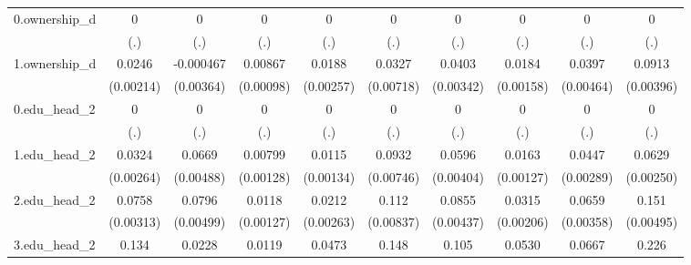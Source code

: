 \begin{table}[htbp]
\begin{tabular}{l*{9}{c}}
0.ownership\_d&           0         &           0         &           0         &           0         &           0         &           0         &           0         &           0         &           0         \\
            &         (.)         &         (.)         &         (.)         &         (.)         &         (.)         &         (.)         &         (.)         &         (.)         &         (.)         \\
1.ownership\_d&      0.0246\sym{***}&   -0.000467         &     0.00867\sym{***}&      0.0188\sym{***}&      0.0327\sym{***}&      0.0403\sym{***}&      0.0184\sym{***}&      0.0397\sym{***}&      0.0913\sym{***}\\
            &   (0.00214)         &   (0.00364)         &   (0.00098)         &   (0.00257)         &   (0.00718)         &   (0.00342)         &   (0.00158)         &   (0.00464)         &   (0.00396)         \\
0.edu\_head\_2&           0         &           0         &           0         &           0         &           0         &           0         &           0         &           0         &           0         \\
            &         (.)         &         (.)         &         (.)         &         (.)         &         (.)         &         (.)         &         (.)         &         (.)         &         (.)         \\
1.edu\_head\_2&      0.0324\sym{***}&      0.0669\sym{***}&     0.00799\sym{***}&      0.0115\sym{***}&      0.0932\sym{***}&      0.0596\sym{***}&      0.0163\sym{***}&      0.0447\sym{***}&      0.0629\sym{***}\\
            &   (0.00264)         &   (0.00488)         &   (0.00128)         &   (0.00134)         &   (0.00746)         &   (0.00404)         &   (0.00127)         &   (0.00289)         &   (0.00250)         \\
2.edu\_head\_2&      0.0758\sym{***}&      0.0796\sym{***}&      0.0118\sym{***}&      0.0212\sym{***}&       0.112\sym{***}&      0.0855\sym{***}&      0.0315\sym{***}&      0.0659\sym{***}&       0.151\sym{***}\\
            &   (0.00313)         &   (0.00499)         &   (0.00127)         &   (0.00263)         &   (0.00837)         &   (0.00437)         &   (0.00206)         &   (0.00358)         &   (0.00495)         \\
3.edu\_head\_2&       0.134\sym{***}&      0.0228\sym{***}&      0.0119\sym{***}&      0.0473\sym{***}&       0.148\sym{***}&       0.105\sym{***}&      0.0530\sym{***}&      0.0667\sym{***}&       0.226\sym{***}\\

\end{tabular}
\end{table}
